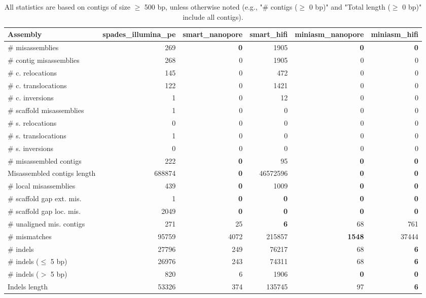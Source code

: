 \documentclass[12pt,a4paper]{article}
\begin{document}
\begin{table}[ht]
\begin{center}
\caption{All statistics are based on contigs of size $\geq$ 500 bp, unless otherwise noted (e.g., "\# contigs ($\geq$ 0 bp)" and "Total length ($\geq$ 0 bp)" include all contigs).}
\begin{tabular}{|l*{5}{|r}|}
\hline
Assembly & spades\_illumina\_pe & smart\_nanopore & smart\_hifi & miniasm\_nanopore & miniasm\_hifi \\ \hline
\# misassemblies & 269 & {\bf 0} & 1905 & {\bf 0} & {\bf 0} \\ \hline
\hspace{2mm}\# contig misassemblies & 268 & 0 & 1905 & 0 & 0 \\ \hline
\hspace{5mm}\# c. relocations & 145 & 0 & 472 & 0 & 0 \\ \hline
\hspace{5mm}\# c. translocations & 122 & 0 & 1421 & 0 & 0 \\ \hline
\hspace{5mm}\# c. inversions & 1 & 0 & 12 & 0 & 0 \\ \hline
\hspace{2mm}\# scaffold misassemblies & 1 & 0 & 0 & 0 & 0 \\ \hline
\hspace{5mm}\# s. relocations & 0 & 0 & 0 & 0 & 0 \\ \hline
\hspace{5mm}\# s. translocations & 1 & 0 & 0 & 0 & 0 \\ \hline
\hspace{5mm}\# s. inversions & 0 & 0 & 0 & 0 & 0 \\ \hline
\# misassembled contigs & 222 & {\bf 0} & 95 & {\bf 0} & {\bf 0} \\ \hline
Misassembled contigs length & 688874 & {\bf 0} & 46572596 & {\bf 0} & {\bf 0} \\ \hline
\# local misassemblies & 439 & {\bf 0} & 1009 & {\bf 0} & {\bf 0} \\ \hline
\# scaffold gap ext. mis. & 1 & {\bf 0} & {\bf 0} & {\bf 0} & {\bf 0} \\ \hline
\# scaffold gap loc. mis. & 2049 & {\bf 0} & {\bf 0} & {\bf 0} & {\bf 0} \\ \hline
\# unaligned mis. contigs & 271 & 25 & {\bf 6} & 68 & 761 \\ \hline
\# mismatches & 95759 & 4072 & 215857 & {\bf 1548} & 37444 \\ \hline
\# indels & 27796 & 249 & 76217 & 68 & {\bf 6} \\ \hline
\hspace{5mm}\# indels ($\leq$ 5 bp) & 26976 & 243 & 74311 & 68 & {\bf 6} \\ \hline
\hspace{5mm}\# indels ($>$ 5 bp) & 820 & 6 & 1906 & {\bf 0} & {\bf 0} \\ \hline
Indels length & 53326 & 374 & 135745 & 97 & {\bf 6} \\ \hline
\end{tabular}
\end{center}
\end{table}
\end{document}
